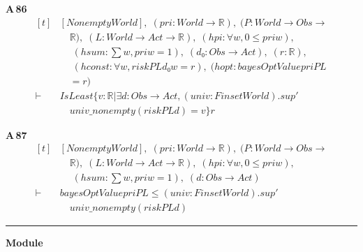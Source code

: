 \noindent\textbf{A\,86}\quad{}
{\footnotesize\[ \begin{aligned}[t]
&[\mathit{Nonempty} \mathit{World}],\; (\mathit{pri} : \mathit{World} \to \mathbb{R} ),\; (\mathit{P} : \mathit{World} \to \mathit{Obs} \to\\
&\quad \mathbb{R} ),\; (\mathit{L} : \mathit{World} \to \mathit{Act} \to \mathbb{R} ),\; (\mathit{hpi} : \forall \mathit{w}, 0 \leq \mathit{pri} \mathit{w}),\\
&\quad \; (\mathit{hsum} : \textstyle\sum \mathit{w}, \mathit{pri} \mathit{w} = 1),\; (\mathit{d₀} : \mathit{Obs} \to \mathit{Act}),\; (\mathit{r} : \mathbb{R} ),\\
&\quad \; (\mathit{hconst} : \forall \mathit{w}, \mathit{risk} \mathit{P} \mathit{L} \mathit{d₀} \mathit{w} = \mathit{r}),\; (\mathit{hopt} : \mathit{bayesOptValue} \mathit{pri} \mathit{P} \mathit{L}\\
&\quad = \mathit{r})\\
\vdash\;&\mathit{IsLeast} \{ \mathit{v} : \mathbb{R} | \exists \mathit{d} : \mathit{Obs} \to \mathit{Act}, (\mathit{univ} : \mathit{Finset} \mathit{World}).\mathit{sup'}\\
&\quad \mathit{univ\_nonempty} (\mathit{risk} \mathit{P} \mathit{L} \mathit{d}) = \mathit{v}\} \mathit{r}
\end{aligned} \]}

\noindent\textbf{A\,87}\quad{}
{\footnotesize\[ \begin{aligned}[t]
&[\mathit{Nonempty} \mathit{World}],\; (\mathit{pri} : \mathit{World} \to \mathbb{R} ),\; (\mathit{P} : \mathit{World} \to \mathit{Obs} \to\\
&\quad \mathbb{R} ),\; (\mathit{L} : \mathit{World} \to \mathit{Act} \to \mathbb{R} ),\; (\mathit{hpi} : \forall \mathit{w}, 0 \leq \mathit{pri} \mathit{w}),\\
&\quad \; (\mathit{hsum} : \textstyle\sum \mathit{w}, \mathit{pri} \mathit{w} = 1),\; (\mathit{d} : \mathit{Obs} \to \mathit{Act})\\
\vdash\;&\mathit{bayesOptValue} \mathit{pri} \mathit{P} \mathit{L} \leq (\mathit{univ} : \mathit{Finset} \mathit{World}).\mathit{sup'}\\
&\quad \mathit{univ\_nonempty} (\mathit{risk} \mathit{P} \mathit{L} \mathit{d})
\end{aligned} \]}

\vspace{4pt}\noindent\rule{\columnwidth}{0.4pt}\par\vspace{2pt}
\noindent\textbf{Module }\par\vspace{3pt}

